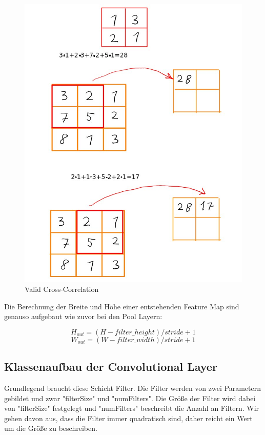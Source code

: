 \documentclass[12pt]{article}
\begin{document}
\begin{figure}[H]
\centering
\includegraphics[scale=0.5]{./Images/005_Valid_Correlation.jpg}
\caption{Valid Cross-Correlation}
\label{Valid Cross-Correlation}
\end{figure}

Die Berechnung der Breite und Höhe einer entstehenden Feature Map sind genauso aufgebaut wie zuvor bei den Pool Layern:

$$H_{out} = (H - filter\_height)/stride + 1$$
$$W_{out} = (W - filter\_ width)/stride + 1$$







\cleardoublepage
\subsection{Klassenaufbau der Convolutional Layer}
Grundlegend braucht diese Schicht Filter. Die Filter werden von zwei Parametern gebildet und zwar "filterSize" und "numFilters". Die Größe der Filter wird dabei von "filterSize" festgelegt und "numFilters" beschreibt die Anzahl an Filtern. Wir gehen davon aus, dass die Filter immer quadratisch sind, daher reicht ein Wert um die Größe zu beschreiben.
\end{document}
